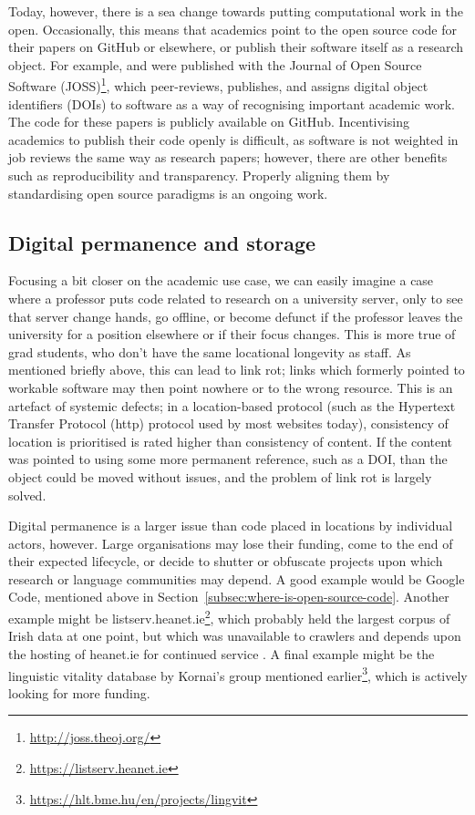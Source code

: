 Today, however, there is a sea change towards putting computational work in the open. Occasionally, this means that academics point to the open source code for their papers on GitHub or elsewhere, or publish their software itself as a research object. For example, \citet{makela2016integrated} and \citet{kleinberg2017web} were published with the Journal of Open Source Software (JOSS)\footnote{\href{http://joss.theoj.org/}{http://joss.theoj.org/}}, which peer-reviews, publishes, and assigns digital object identifiers (DOIs) to software as a way of recognising important academic work. The code for these papers is publicly available on GitHub. Incentivising academics to publish their code openly is difficult, as software is not weighted in job reviews the same way as research papers; however, there are other benefits such as reproducibility and transparency. Properly aligning them by standardising open source paradigms is an ongoing work.

\subsection{Digital permanence and storage}
\label{subsec:digital-permanence}

Focusing a bit closer on the academic use case, we can easily imagine a case where a professor puts code related to research on a university server, only to see that server change hands, go offline, or become defunct if the professor leaves the university for a position elsewhere or if their focus changes. This is more true of grad students, who don't have the same locational longevity as staff. As mentioned briefly above, this can lead to link rot; links which formerly pointed to workable software may then point nowhere or to the wrong resource. This is an artefact of systemic defects; in a location-based protocol (such as the Hypertext Transfer Protocol (http) protocol used by most websites today), consistency of location is prioritised is rated higher than consistency of content. If the content was pointed to using some more permanent reference, such as a DOI, than the object could be moved without issues, and the problem of link rot is largely solved.

Digital permanence is a larger issue than code placed in locations by individual actors, however. Large organisations may lose their funding, come to the end of their expected lifecycle, or decide to shutter or obfuscate projects upon which research or language communities may depend. A good example would be Google Code, mentioned above in Section~\ref{subsec:where-is-open-source-code}. Another example might be listserv.heanet.ie\footnote{\href{https://listserv.heanet.ie}{https://listserv.heanet.ie}}, which probably held the largest corpus of Irish data at one point, but which was unavailable to crawlers and depends upon the hosting of heanet.ie for continued service \citep{scannell2007crubadan}. A final example might be the linguistic vitality database by Kornai's group mentioned earlier\footnote{\href{https://hlt.bme.hu/en/projects/lingvit}{https://hlt.bme.hu/en/projects/lingvit}}, which is actively looking for more funding.

